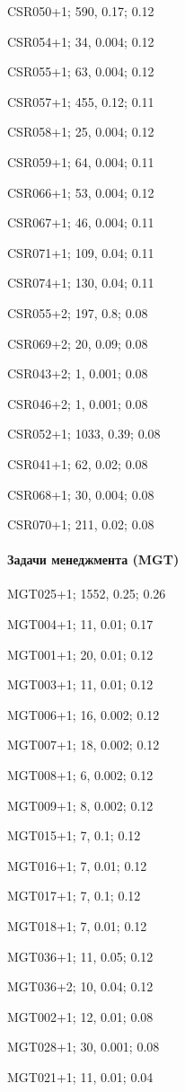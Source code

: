 CSR050+1; 590, 0.17; 0.12

CSR054+1; 34, 0.004; 0.12

CSR055+1; 63, 0.004; 0.12

CSR057+1; 455, 0.12; 0.11

CSR058+1; 25, 0.004; 0.12

CSR059+1; 64, 0.004; 0.11

CSR066+1; 53, 0.004; 0.12

CSR067+1; 46, 0.004; 0.11

CSR071+1; 109, 0.04; 0.11

CSR074+1; 130, 0.04; 0.11

CSR055+2; 197, 0.8; 0.08

CSR069+2; 20, 0.09; 0.08

CSR043+2; 1, 0.001; 0.08 

CSR046+2; 1, 0.001; 0.08

CSR052+1; 1033, 0.39; 0.08

CSR041+1; 62, 0.02; 0.08

CSR068+1; 30, 0.004; 0.08

CSR070+1; 211, 0.02; 0.08

\paragraph{Задачи менеджмента (MGT)}

MGT025+1; 1552, 0.25; 0.26

MGT004+1; 11, 0.01; 0.17

MGT001+1; 20, 0.01; 0.12

MGT003+1; 11, 0.01; 0.12

MGT006+1; 16, 0.002; 0.12

MGT007+1; 18, 0.002; 0.12

MGT008+1; 6, 0.002; 0.12

MGT009+1; 8, 0.002; 0.12

MGT015+1; 7, 0.1; 0.12

MGT016+1; 7, 0.01; 0.12

MGT017+1; 7, 0.1; 0.12

MGT018+1; 7, 0.01; 0.12

MGT036+1; 11, 0.05; 0.12

MGT036+2; 10, 0.04; 0.12

MGT002+1; 12, 0.01; 0.08

MGT028+1; 30, 0.001; 0.08

MGT021+1; 11, 0.01; 0.04

